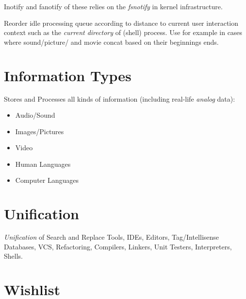 \documentclass[a4paper,10pt,twocolumn]{article}
\begin{document}
Inotify and fanotify of these relies on the \emph{fsnotify} in kernel
infrastructure.

Reorder idle processing queue according to distance to current user interaction
context such as the \emph{current directory} of (shell) process. Use for example
in cases where sound/picture/ and movie concat based on their beginnings ends.

\section{Information Types}

Stores and Processes all kinds of information (including real-life \emph{analog} data):
\begin{itemize}
\item Audio/Sound
\item Images/Pictures
\item Video
\item Human Languages
\item Computer Languages
\end{itemize}

\section{Unification}

\emph{Unification} of Search and Replace Tools, IDEs, Editors, Tag/Intellisense
Databases, VCS, Refactoring, Compilers, Linkers, Unit Testers, Interpreters,
Shells.

\section{Wishlist}
\end{document}

